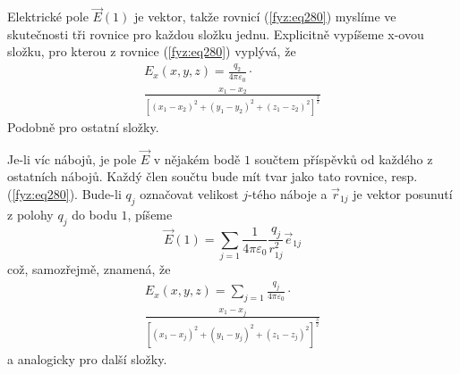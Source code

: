     Elektrické pole \(\vec{E}(1)\) je vektor, takže rovnicí (\ref{fyz:eq280}) myslíme ve 
    skutečnosti tři rovnice pro  každou složku jednu. Explicitně vypíšeme x-ovou složku, pro kterou 
    z rovnice (\ref{fyz:eq280}) vyplývá, že
    \begin{equation*} 
      \begin{multlined}
        E_x(x,y,z) = \frac{q_2}{4\pi\varepsilon_0}\cdot \\
                     \frac{x_1-x_2}{[(x_1-x_2)^2+(y_1-y_2)^2+(z_1-z_2)^2]^{\frac{3}{2}}}
      \end{multlined}
    \end{equation*}  
    Podobně pro ostatní složky.
     
    Je-li víc nábojů, je pole \(\vec{E}\) v nějakém bodě \(1\) součtem příspěvků od každého z 
    ostatních nábojů. Každý člen součtu bude mít tvar jako tato rovnice, resp. 
    (\ref{fyz:eq280}). Bude-li \(q_j\) označovat velikost \(j\)-tého náboje a  
    \(\vec{r}_{1j}\) je vektor posunutí z polohy 
    \(q_j\) do bodu \(1\), píšeme
    \begin{equation}  \label{fyz:eq276} 
      \vec{E}(1) = \sum\limits_{j=1}\frac{1}{4\pi\varepsilon_0}\frac{q_j}{r^2_{1j}}\vec{e}_{1j}                     
    \end{equation}
    což, samozřejmě, znamená, že
    \begin{equation*} 
      \begin{multlined}
      E_x(x,y,z) = \sum\limits_{j=1}\frac{q_j}{4\pi\varepsilon_0}\cdot  \\
                    \frac{x_1-x_j}{[(x_1-x_j)^2+(y_1-y_j)^2+(z_1-z_j)^2]^{\frac{3}{2}}}
      \end{multlined} 
    \end{equation*}    
    a analogicky pro další složky.
    
